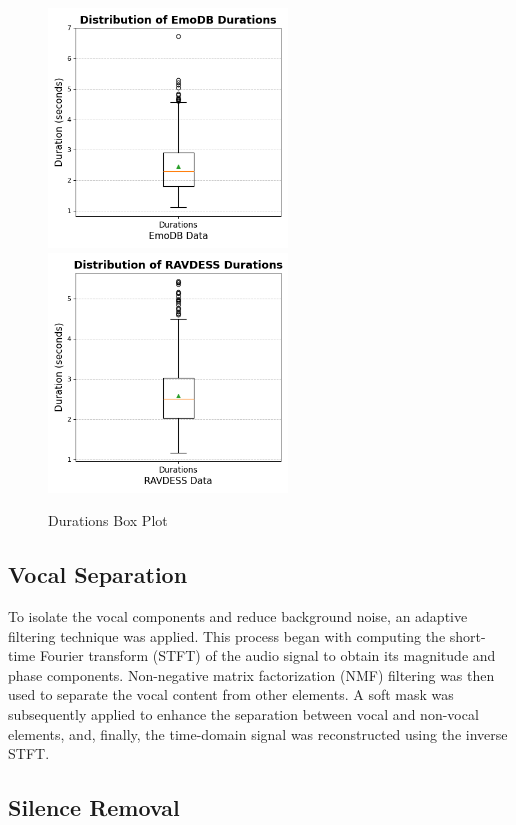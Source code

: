 \begin{figure}[H]
  \centering
  \includegraphics[width = 2.5in, keepaspectratio]{figures/Durations Box Plot - EmoDB.png}
  \includegraphics[width = 2.5in, keepaspectratio]{figures/Durations Box Plot - RAVDESS.png}
  \caption{Durations Box Plot}
\end{figure}

\subsection{Vocal Separation}

To isolate the vocal components and reduce background noise, an adaptive filtering technique was applied. This process began with computing the short-time Fourier transform (STFT) of the audio signal to obtain its magnitude and phase components. Non-negative matrix factorization (NMF) filtering was then used to separate the vocal content from other elements. A soft mask was subsequently applied to enhance the separation between vocal and non-vocal elements, and, finally, the time-domain signal was reconstructed using the inverse STFT.

\subsection{Silence Removal}

